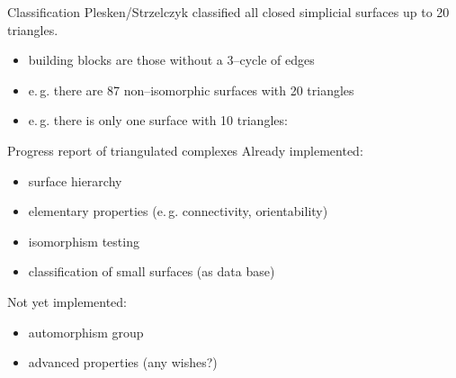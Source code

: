 \begin{frame}{Classification}
    \pause
    Plesken/Strzelczyk classified all closed simplicial surfaces up to 20 triangles.

    \begin{itemize}
        \pause
        \item building blocks are those without a 3--cycle of edges
        \pause
        \item e.\,g. there are 87 non--isomorphic surfaces with 20 triangles
        \pause
        \item e.\,g. there is only one surface with 10 triangles:
    \end{itemize}

    \pause
    \begin{center}
    \end{center}
\end{frame}


\begin{frame}{Progress report of triangulated complexes}
    \pause
    Already implemented:
    \begin{itemize}
        \pause
        \item surface hierarchy
        \pause
        \item elementary properties (e.\,g. connectivity, orientability)
        \pause
        \item isomorphism testing
        \pause
        \item classification of small surfaces (as data base)
    \end{itemize}

    \pause
    Not yet implemented:
    \begin{itemize}
        \pause
        \item automorphism group
        \pause
        \item advanced properties (any wishes?)
    \end{itemize}
\end{frame}
